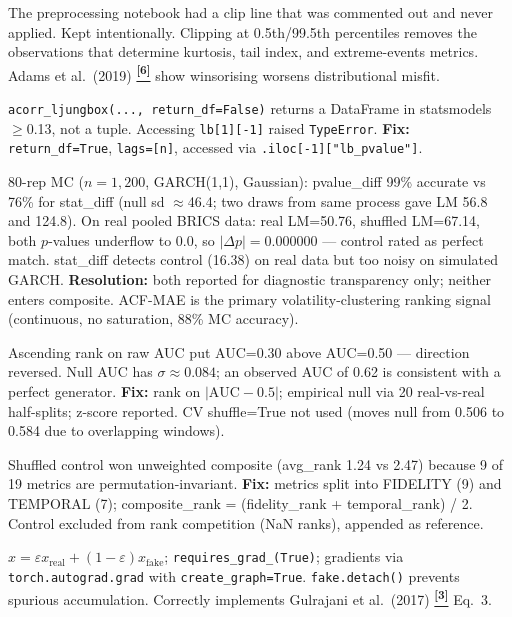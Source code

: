 \documentclass[10pt]{article}
\newcommand{\auditrow}[5]{%
  \begin{tcolorbox}[mybox={#2}{#3},
    title={\textbf{[#1]}\quad #4},
    before skip=4pt, after skip=4pt, breakable]
  \small #5
  \end{tcolorbox}}
\newcommand{\tcite}[1]{%
  \hyperlink{R:#1}{\textsuperscript{\scriptsize\textbf{[#1]}}}}
\begin{document}
\auditrow{DECISION}{Indigo}{IBg}%
  {No outlier clipping applied to log returns --- deliberate}%
  {The preprocessing notebook had a clip line that was commented out and never applied. Kept intentionally. Clipping at 0.5th/99.5th percentiles removes the observations that determine kurtosis, tail index, and extreme-events metrics. Adams et al.\ (2019)\tcite{6} show winsorising worsens distributional misfit.}

\auditrow{FIXED}{Amber}{ABg}%
  {Ljung-Box used deprecated statsmodels API}%
  {\texttt{acorr\_ljungbox(..., return\_df=False)} returns a DataFrame in statsmodels $\geq$0.13, not a tuple. Accessing \texttt{lb[1][-1]} raised \texttt{TypeError}. \textbf{Fix:} \texttt{return\_df=True}, \texttt{lags=[n]}, accessed via \texttt{.iloc[-1]["lb\_pvalue"]}.}

\auditrow{REVISED}{Amber}{ABg}%
  {ARCH-LM: both variants demoted to Descriptive; neither reliable across regimes}%
  {80-rep MC ($n=1{,}200$, GARCH(1,1), Gaussian): pvalue\_diff 99\% accurate vs 76\% for stat\_diff (null sd $\approx$46.4; two draws from same process gave LM 56.8 and 124.8). On real pooled BRICS data: real LM=50.76, shuffled LM=67.14, both $p$-values underflow to 0.0, so $|\Delta p|=0.000000$ --- control rated as perfect match. stat\_diff detects control (16.38) on real data but too noisy on simulated GARCH. \textbf{Resolution:} both reported for diagnostic transparency only; neither enters composite. ACF-MAE is the primary volatility-clustering ranking signal (continuous, no saturation, 88\% MC accuracy).}

\auditrow{FIXED}{Amber}{ABg}%
  {Discriminative AUC direction bug + no null calibration}%
  {Ascending rank on raw AUC put AUC=0.30 above AUC=0.50 --- direction reversed. Null AUC has $\sigma \approx 0.084$; an observed AUC of 0.62 is consistent with a perfect generator. \textbf{Fix:} rank on $|\text{AUC}-0.5|$; empirical null via 20 real-vs-real half-splits; z-score reported. CV shuffle=True not used (moves null from 0.506 to 0.584 due to overlapping windows).}

\auditrow{FIXED}{Amber}{ABg}%
  {Composite ranking: fidelity/temporal split + shuffled-control exclusion}%
  {Shuffled control won unweighted composite (avg\_rank 1.24 vs 2.47) because 9 of 19 metrics are permutation-invariant. \textbf{Fix:} metrics split into FIDELITY (9) and TEMPORAL (7); composite\_rank = (fidelity\_rank + temporal\_rank) / 2. Control excluded from rank competition (NaN ranks), appended as reference.}

\auditrow{OK}{FGreen}{GBg}%
  {WGAN-GP gradient penalty computation is correct (QuantGAN \& FinGAN)}%
  {$\hat{x} = \varepsilon x_\text{real} + (1-\varepsilon)x_\text{fake}$; \texttt{requires\_grad\_(True)}; gradients via \texttt{torch.autograd.grad} with \texttt{create\_graph=True}. \texttt{fake.detach()} prevents spurious accumulation. Correctly implements Gulrajani et al.\ (2017)\tcite{3} Eq.~3.}
\end{document}
